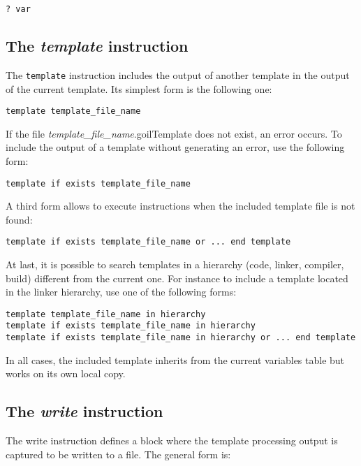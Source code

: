 \begin{lstlisting}
? var
\end{lstlisting}

\subsection{The {\em template} instruction}

The {\tt template} instruction includes the output of another template in the output of the current template. Its simplest form is the following one:

\begin{lstlisting}
template template_file_name
\end{lstlisting}

If the file {\em template\_file\_name}.goilTemplate does not exist, an error occurs. To include the output of a template without generating an error, use the following form:

\begin{lstlisting}
template if exists template_file_name
\end{lstlisting}

A third form allows to execute instructions when the included template file is not found:

\begin{lstlisting}
template if exists template_file_name or ... end template
\end{lstlisting}

At last, it is possible to search templates in a hierarchy (code, linker, compiler, build) different from the current one. For instance to include a template located in the linker hierarchy, use one of the following forms:

\begin{lstlisting}
template template_file_name in hierarchy
template if exists template_file_name in hierarchy
template if exists template_file_name in hierarchy or ... end template
\end{lstlisting}


In all cases, the included template inherits from the current variables table but works on its own local copy.

\subsection{The {\em write} instruction}

The write instruction defines a block where the template processing output is captured to be written to a file. The general form is:

